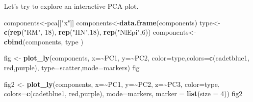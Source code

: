\documentclass[
]{article}
\newenvironment{Shaded}{\begin{snugshade}}{\end{snugshade}}
\newcommand{\AttributeTok}[1]{\textcolor[rgb]{0.13,0.29,0.53}{#1}}
\newcommand{\DecValTok}[1]{\textcolor[rgb]{0.00,0.00,0.81}{#1}}
\newcommand{\FunctionTok}[1]{\textcolor[rgb]{0.13,0.29,0.53}{\textbf{#1}}}
\newcommand{\NormalTok}[1]{#1}
\newcommand{\OtherTok}[1]{\textcolor[rgb]{0.56,0.35,0.01}{#1}}
\newcommand{\SpecialCharTok}[1]{\textcolor[rgb]{0.81,0.36,0.00}{\textbf{#1}}}
\newcommand{\StringTok}[1]{\textcolor[rgb]{0.31,0.60,0.02}{#1}}
\begin{document}
Let's try to explore an interactive PCA plot.

\begin{Shaded}
\begin{Highlighting}[]
\NormalTok{components}\OtherTok{\textless{}{-}}\NormalTok{pca[[}\StringTok{"x"}\NormalTok{]]}
\NormalTok{components}\OtherTok{\textless{}{-}}\FunctionTok{data.frame}\NormalTok{(components)}
\NormalTok{type}\OtherTok{\textless{}{-}}\FunctionTok{c}\NormalTok{(}\FunctionTok{rep}\NormalTok{(}\StringTok{"RM"}\NormalTok{, }\DecValTok{18}\NormalTok{), }\FunctionTok{rep}\NormalTok{(}\StringTok{"HN"}\NormalTok{,}\DecValTok{18}\NormalTok{), }\FunctionTok{rep}\NormalTok{(}\StringTok{"NlEpi"}\NormalTok{,}\DecValTok{6}\NormalTok{))}
\NormalTok{components}\OtherTok{\textless{}{-}}\FunctionTok{cbind}\NormalTok{(components, type )}

\NormalTok{fig }\OtherTok{\textless{}{-}} \FunctionTok{plot\_ly}\NormalTok{(components, }\AttributeTok{x=}\SpecialCharTok{\textasciitilde{}}\NormalTok{PC1, }\AttributeTok{y=}\SpecialCharTok{\textasciitilde{}}\NormalTok{PC2, }
               \AttributeTok{color=}\NormalTok{type,}\AttributeTok{colors=}\FunctionTok{c}\NormalTok{(}\StringTok{\textquotesingle{}cadetblue1\textquotesingle{}}\NormalTok{, }\StringTok{\textquotesingle{}red\textquotesingle{}}\NormalTok{,}\StringTok{\textquotesingle{}purple\textquotesingle{}}\NormalTok{), }
               \AttributeTok{type=}\StringTok{\textquotesingle{}scatter\textquotesingle{}}\NormalTok{,}\AttributeTok{mode=}\StringTok{\textquotesingle{}markers\textquotesingle{}}\NormalTok{)}
\NormalTok{fig}
\end{Highlighting}
\end{Shaded}

\begin{Shaded}
\begin{Highlighting}[]
\NormalTok{fig2 }\OtherTok{\textless{}{-}} \FunctionTok{plot\_ly}\NormalTok{(components, }\AttributeTok{x=}\SpecialCharTok{\textasciitilde{}}\NormalTok{PC1, }\AttributeTok{y=}\SpecialCharTok{\textasciitilde{}}\NormalTok{PC2, }\AttributeTok{z=}\SpecialCharTok{\textasciitilde{}}\NormalTok{PC3, }
                \AttributeTok{color=}\NormalTok{type, }\AttributeTok{colors=}\FunctionTok{c}\NormalTok{(}\StringTok{\textquotesingle{}cadetblue1\textquotesingle{}}\NormalTok{, }\StringTok{\textquotesingle{}red\textquotesingle{}}\NormalTok{,}\StringTok{\textquotesingle{}purple\textquotesingle{}}\NormalTok{),}
                \AttributeTok{mode=}\StringTok{\textquotesingle{}markers\textquotesingle{}}\NormalTok{, }\AttributeTok{marker =} \FunctionTok{list}\NormalTok{(}\AttributeTok{size =} \DecValTok{4}\NormalTok{))}
\NormalTok{fig2}
\end{Highlighting}
\end{Shaded}
\end{document}
